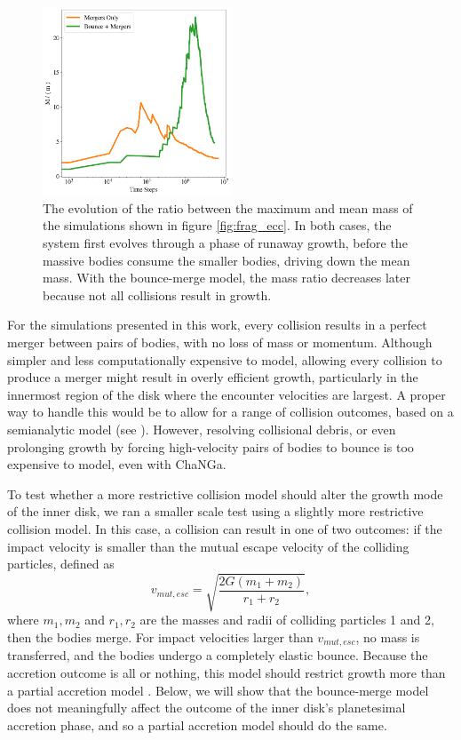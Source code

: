 \documentclass[twocolumn]{aastex63}
\begin{document}
\begin{figure}
\begin{center}
    \includegraphics[width=0.5\textwidth]{figures/frag_evo.png}
    \caption{The evolution of the ratio between the maximum and mean mass of the simulations shown in figure \ref{fig:frag_ecc}. In both cases, the system first evolves through a phase of runaway growth, before the massive bodies consume the smaller bodies, driving down the mean mass. With the bounce-merge model, the mass ratio decreases later because not all collisions result in growth.\label{fig:frag_evo}}
\end{center}
\end{figure}

For the simulations presented in this work, every collision results in a perfect merger between pairs of bodies, with no loss
of mass or momentum. Although simpler and less computationally expensive to model, allowing every collision to produce a
merger might result in overly efficient growth, particularly in the innermost region of the disk where the encounter velocities are largest. A proper way to handle this would be to allow for a range of collision outcomes, based on a semianalytic model (see \citet{leinhardt12}). However, resolving collisional debris, or even prolonging growth by forcing high-velocity pairs of bodies to bounce is too expensive to model, even with {\sc ChaNGa}.

To test whether a more restrictive collision model should alter the growth mode of the inner disk, we ran a smaller scale test using a slightly more restrictive collision model. In this case, a collision can result in one of two outcomes: if the impact velocity is smaller than the mutual escape velocity of the colliding particles, defined as
\begin{equation}\label{eq:v_mut}
	v_{mut, esc} = \sqrt{\frac{2 G (m_{1} + m_{2})}{r_{1} + r_{2}}},
\end{equation}
where $m_{1}, m_{2}$ and $r_{1}, r_{2}$ are the masses and radii of
colliding particles 1 and 2, then the bodies merge. For
impact velocities larger than $v_{mut, esc}$, no mass is transferred, and the bodies undergo a completely elastic bounce. Because the accretion outcome is all or nothing, this model should restrict growth more than a partial accretion model \citep{leinhardt12}. Below, we will show that the bounce-merge model does not meaningfully affect the outcome of the inner disk's planetesimal accretion phase, and so a partial accretion model should do the same.
\end{document}

